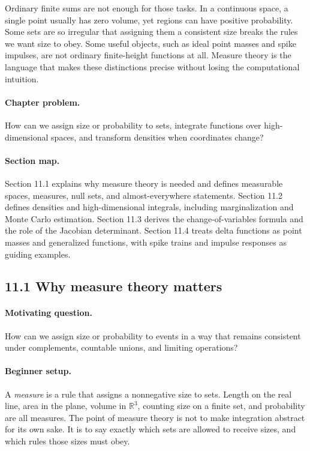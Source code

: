 Ordinary finite sums are not enough for those tasks. In a continuous space, a single point usually has zero volume, yet regions can have positive probability. Some sets are so irregular that assigning them a consistent size breaks the rules we want size to obey. Some useful objects, such as ideal point masses and spike impulses, are not ordinary finite-height functions at all. Measure theory is the language that makes these distinctions precise without losing the computational intuition.

\paragraph{Chapter problem.}
How can we assign size or probability to sets, integrate functions over high-dimensional spaces, and transform densities when coordinates change?

\paragraph{Section map.}
Section 11.1 explains why measure theory is needed and defines measurable spaces, measures, null sets, and almost-everywhere statements. Section 11.2 defines densities and high-dimensional integrals, including marginalization and Monte Carlo estimation. Section 11.3 derives the change-of-variables formula and the role of the Jacobian determinant. Section 11.4 treats delta functions as point masses and generalized functions, with spike trains and impulse responses as guiding examples.

\subsection{11.1 Why measure theory matters}

\paragraph{Motivating question.}
How can we assign size or probability to events in a way that remains consistent under complements, countable unions, and limiting operations?

\paragraph{Beginner setup.}
A \emph{measure} is a rule that assigns a nonnegative size to sets. Length on the real line, area in the plane, volume in \(\mathbb{R}^3\), counting size on a finite set, and probability are all measures. The point of measure theory is not to make integration abstract for its own sake. It is to say exactly which sets are allowed to receive sizes, and which rules those sizes must obey.

